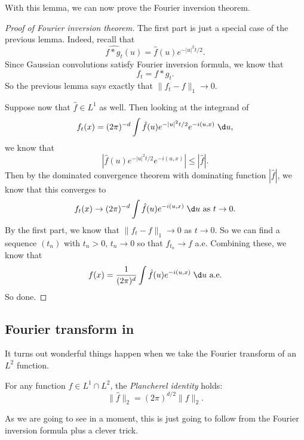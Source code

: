 \documentclass[a4paper]{article}
\begin{document}
With this lemma, we can now prove the Fourier inversion theorem.
\begin{proof}[Proof of Fourier inversion theorem]
  The first part is just a special case of the previous lemma. Indeed, recall that
  \[
    \widehat{f * g_t} (u) = \hat{f}(u) e^{-|u|^2 t/2}.
  \]
  Since Gaussian convolutions satisfy Fourier inversion formula, we know that
  \[
    f_t = f * g_t.
  \]
  So the previous lemma says exactly that $\|f_t - f\|_1 \to 0$.

  Suppose now that $\hat{f} \in L^1$ as well. Then looking at the integrand of
  \[
    f_t(x) = (2\pi)^{-d} \int \hat{f}(u) e^{-|u|^2t/2} e^{-i(u, x)}\;\d u,
  \]
  we know that
  \[
    \left| \hat{f}(u) e^{-|u|^2t/2} e^{-i(u, x)}\right| \leq |\hat{f}|.
  \]
  Then by the dominated convergence theorem with dominating function $|\hat{f}|$, we know that this converges to
  \[
    f_t(x) \to (2\pi)^{-d} \int \hat{f}(u) e^{-i(u, x)}\;\d u\text{ as }t \to 0.
  \]
  By the first part, we know that $\|f_t - f\|_1 \to 0$ as $t \to 0$. So we can find a sequence $(t_n)$ with $t_n > 0$, $t_n \to 0$ so that $f_{t_n} \to f$ a.e. Combining these, we know that
  \[
    f(x) = \frac{1}{(2\pi)^d} \int \hat{f}(u) e^{-i(u, x)}\;\d u \text{ a.e.}
  \]
  So done.
\end{proof}

\subsection{Fourier transform in }
It turns out wonderful things happen when we take the Fourier transform of an $L^2$ function.
\begin{thm}
  For any function $f \in L^1 \cap L^2$, the \emph{Plancherel identity} holds:
  \[
    \|\hat{f}\|_2 = (2\pi)^{d/2} \|f\|_2.
  \]
\end{thm}
As we are going to see in a moment, this is just going to follow from the Fourier inversion formula plus a clever trick.
\end{document}
